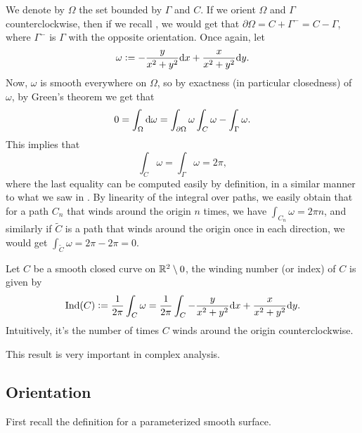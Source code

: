 \documentclass[11pt,a4paper]{article}
\begin{document}
\begin{center}
\end{center}
We denote by $\Omega$ the set bounded by $\Gamma$ and $C$.
If we orient $\Omega$ and $\Gamma$ counterclockwise,
then if we recall ,
we would get that $\partial \Omega = C + \Gamma^{-} = C - \Gamma$,
where $\Gamma^{-}$ is $\Gamma$ with the opposite orientation.
Once again, let
\[
  \omega := -\frac{y}{x^2 + y^2} \dx + \frac{x}{x^2 + y^2} \dy.
\]
Now, $\omega$ is smooth everywhere on $\Omega$,
so by exactness (in particular closedness) of $\omega$,
by Green's theorem we get that
\[
  0 =
  \int_{\Omega} \mathrm{d} \omega =
  \int_{\partial \Omega} \omega
  \int_{C} \omega - \int_{\Gamma} \omega.
\]
This implies that
\[
  \int_{C} \omega = \int_{\Gamma} \omega = 2\pi,
\]
where the last equality can be computed easily by definition,
in a similar manner to what we saw in .
By linearity of the integral over paths, we easily obtain that
for a path $C_n$ that winds around the origin $n$ times,
we have $\int_{C_n} \omega = 2\pi n$,
and similarly if $\widetilde C$ is a path that winds around the origin
once in each direction,
we would get $\int_{\widetilde C} \omega = 2\pi - 2\pi = 0$.

\begin{definition}
  Let $C$ be a smooth closed curve on $\mathbb{R}^2 \setminus 0$,
  the winding number (or index) of $C$ is given by
  \[
    \Ind(C) :=
    \frac{1}{2\pi} \int_{C} \omega =
    \frac{1}{2\pi} \int_{C} -\frac{y}{x^2 + y^2} \dx + \frac{x}{x^2 + y^2} \dy.
  \]
  Intuitively, it's the number of times $C$ winds around the origin
  counterclockwise.
\end{definition}

\begin{remark}
  This result is very important in complex analysis.
\end{remark}

\subsection{Orientation}
\label{ssec:orientation-and-flux}
First recall the definition for a parameterized smooth surface.
\end{document}
